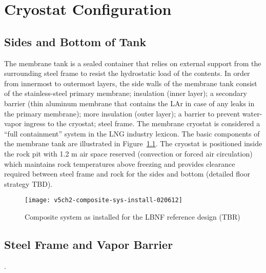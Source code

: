 
\chapter{Cryostat Configuration}
\label{Sec:cryo-cryosys-cryostat}

\section{Sides and Bottom of Tank}

The membrane tank is a sealed container that relies on external support 
from the surrounding steel frame to resist the hydrostatic load of the 
contents. In order from innermost to outermost layers, the side walls 
of the membrane tank consist of the stainless-steel primary membrane; 
insulation (inner layer); a secondary barrier (thin aluminum membrane that contains the LAr 
in case of any leaks in the primary membrane); more insulation (outer layer); a 
barrier to prevent water-vapor ingress to the cryostat; steel frame.  
The membrane cryostat is considered a ``full containment'' 
system in the LNG industry lexicon. The basic components of
the membrane tank are illustrated in Figure~\ref{fig:composite-sys-install}.
The cryostat is positioned inside the rock pit with 1.2 m air space 
reserved (convection or forced air circulation) which maintains rock 
temperatures above freezing and provides clearance required between 
steel frame and rock for the sides and bottom (detailed floor strategy TBD).

\begin{figure}[htbp]
\centering
\texttt{[image: v5ch2-composite-sys-install-020612]}
\caption{Composite system as installed for the LBNF reference design (TBR)} 
\label{fig:composite-sys-install}
\end{figure}



\section{Steel Frame and Vapor Barrier}

. %

